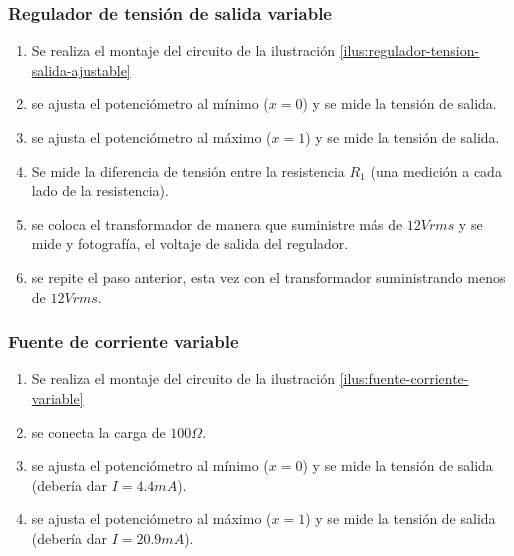 \subsubsection*{Regulador de tensión de salida variable}

\begin{enumerate}
    \item Se realiza el montaje del circuito de la ilustración \ref{ilus:regulador-tension-salida-ajustable}
    \item se ajusta el potenciómetro al mínimo ($x = 0$) y se mide la tensión de salida.
    \item se ajusta el potenciómetro al máximo ($x = 1$) y se mide la tensión de salida.
    \item Se mide la diferencia de tensión entre la resistencia $R_1$ (una medición a cada lado de la resistencia).
    \item se coloca el transformador de manera que suministre más de $12Vrms$ y se mide y fotografía, el voltaje de salida del regulador.
    \item se repite el paso anterior, esta vez con el transformador suministrando menos de $12Vrms$.
\end{enumerate}

\subsubsection*{Fuente de corriente variable}

\begin{enumerate}
    \item Se realiza el montaje del circuito de la ilustración \ref{ilus:fuente-corriente-variable}
    \item se conecta la carga de $100 \Omega$.
    \item se ajusta el potenciómetro al mínimo ($x = 0$) y se mide la tensión de salida (debería dar $I= 4.4 mA$).
    \item se ajusta el potenciómetro al máximo ($x = 1$) y se mide la tensión de salida (debería dar $I= 20.9 mA$).
\end{enumerate}
